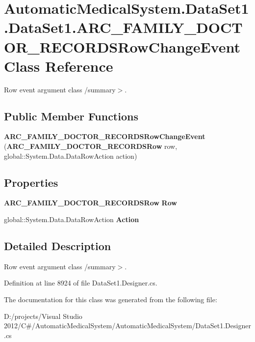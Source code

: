 \section{AutomaticMedicalSystem.DataSet1.DataSet1.ARC\_\-FAMILY\_\-DOCTOR\_\-RECORDSRowChangeEvent Class Reference}
\label{class_automatic_medical_system_1_1_data_set1_1_1_a_r_c___f_a_m_i_l_y___d_o_c_t_o_r___r_e_c_o_r_d_s_row_change_event}
Row event argument class /summary$>$.  


\subsection*{Public Member Functions}
\begin{CompactItemize}
\item 
\textbf{ARC\_\-FAMILY\_\-DOCTOR\_\-RECORDSRowChangeEvent} ({\bf ARC\_\-FAMILY\_\-DOCTOR\_\-RECORDSRow} row, global::System.Data.DataRowAction action)\label{class_automatic_medical_system_1_1_data_set1_1_1_a_r_c___f_a_m_i_l_y___d_o_c_t_o_r___r_e_c_o_r_d_s_row_change_event_afe18c78303a1d4f382ffb0c5deee1c2}

\end{CompactItemize}
\subsection*{Properties}
\begin{CompactItemize}
\item 
{\bf ARC\_\-FAMILY\_\-DOCTOR\_\-RECORDSRow} \textbf{Row}\hspace{0.3cm}{\tt  [get]}\label{class_automatic_medical_system_1_1_data_set1_1_1_a_r_c___f_a_m_i_l_y___d_o_c_t_o_r___r_e_c_o_r_d_s_row_change_event_90d1576ca220cb54c5a30e84d10e5323}

\item 
global::System.Data.DataRowAction \textbf{Action}\hspace{0.3cm}{\tt  [get]}\label{class_automatic_medical_system_1_1_data_set1_1_1_a_r_c___f_a_m_i_l_y___d_o_c_t_o_r___r_e_c_o_r_d_s_row_change_event_18c1643734424ed0c99982c32313959a}

\end{CompactItemize}


\subsection{Detailed Description}
Row event argument class /summary$>$. 

Definition at line 8924 of file DataSet1.Designer.cs.

The documentation for this class was generated from the following file:\begin{CompactItemize}
\item 
D:/projects/Visual Studio 2012/C\#/AutomaticMedicalSystem/AutomaticMedicalSystem/DataSet1.Designer.cs\end{CompactItemize}
